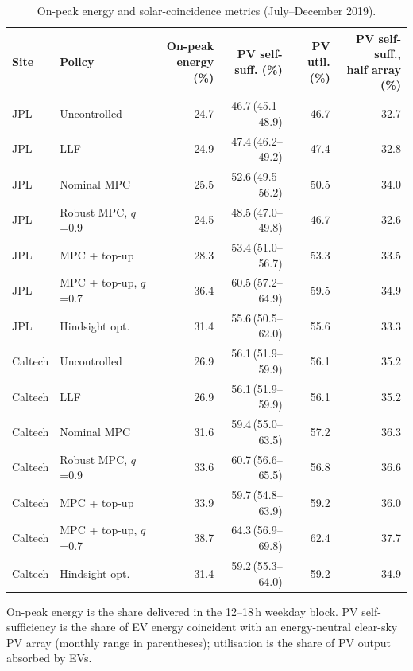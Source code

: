 \begin{table}[!htbp]
\centering
\caption{On-peak energy and solar-coincidence metrics (July--December 2019).}
\label{tab:solar}
\footnotesize
\setlength{\tabcolsep}{1.5pt}
\begin{tabular*}{\textwidth}{@{\extracolsep{\fill}}llrrrr@{}}
\hline
Site & Policy & \makecell[c]{On-peak\\energy (\%)} & \makecell[c]{PV self-\\suff. (\%)} & \makecell[c]{PV util.\\(\%)} & \makecell[c]{PV self-suff.,\\half array (\%)} \\
\hline
JPL & Uncontrolled & 24.7 & 46.7\,{\scriptsize(45.1--48.9)} & 46.7 & 32.7 \\
JPL & LLF & 24.9 & 47.4\,{\scriptsize(46.2--49.2)} & 47.4 & 32.8 \\
JPL & Nominal MPC & 25.5 & 52.6\,{\scriptsize(49.5--56.2)} & 50.5 & 34.0 \\
JPL & Robust MPC, $q$=0.9 & 24.5 & 48.5\,{\scriptsize(47.0--49.8)} & 46.7 & 32.6 \\
JPL & MPC + top-up & 28.3 & 53.4\,{\scriptsize(51.0--56.7)} & 53.3 & 33.5 \\
JPL & MPC + top-up, $q$=0.7 & 36.4 & 60.5\,{\scriptsize(57.2--64.9)} & 59.5 & 34.9 \\
JPL & Hindsight opt. & 31.4 & 55.6\,{\scriptsize(50.5--62.0)} & 55.6 & 33.3 \\
\hline
Caltech & Uncontrolled & 26.9 & 56.1\,{\scriptsize(51.9--59.9)} & 56.1 & 35.2 \\
Caltech & LLF & 26.9 & 56.1\,{\scriptsize(51.9--59.9)} & 56.1 & 35.2 \\
Caltech & Nominal MPC & 31.6 & 59.4\,{\scriptsize(55.0--63.5)} & 57.2 & 36.3 \\
Caltech & Robust MPC, $q$=0.9 & 33.6 & 60.7\,{\scriptsize(56.6--65.5)} & 56.8 & 36.6 \\
Caltech & MPC + top-up & 33.9 & 59.7\,{\scriptsize(54.8--63.9)} & 59.2 & 36.0 \\
Caltech & MPC + top-up, $q$=0.7 & 38.7 & 64.3\,{\scriptsize(56.9--69.8)} & 62.4 & 37.7 \\
Caltech & Hindsight opt. & 31.4 & 59.2\,{\scriptsize(55.3--64.0)} & 59.2 & 34.9 \\
\hline
\end{tabular*}
\par\smallskip\parbox{\textwidth}{\scriptsize On-peak energy is the share delivered in the 12--18\,h weekday block. PV self-sufficiency is the share of EV energy coincident with an energy-neutral clear-sky PV array (monthly range in parentheses); utilisation is the share of PV output absorbed by EVs.}
\end{table}
